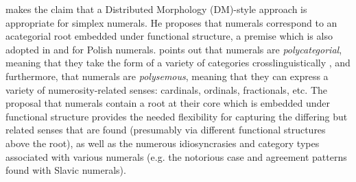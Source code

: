 \documentclass[output=paper]{langscibook}
\begin{document}
\cite[Ch. 3]{fehri2018numRoot} makes the claim that a Distributed Morphology (DM)-style approach is appropriate for simplex numerals. He proposes that numerals correspond to an acategorial root embedded under functional structure, a premise which is also adopted in \citet{klockmann2017semiLex} and \citet{wagiel2017several, wagiel2018fasl} for Polish numerals. \cite[61]{fehri2018numRoot} points out that numerals are \textit{polycategorial}, meaning that they  take the form of a variety of categories crosslinguistically \citep[see e.g.][section 3.4 for examples of nominal, adjectival, verbal, and mixed numerals]{i&m2018}%
, and furthermore, that numerals are \textit{polysemous}, meaning that they can express a variety of numerosity-related senses: cardinals, ordinals, fractionals, etc. The proposal that numerals contain a root at their core which is embedded under functional structure provides the needed flexibility for capturing the differing but related senses that are found (presumably via different functional structures above the root), as well as the numerous idiosyncrasies and category types associated with various numerals (e.g. the notorious case and agreement patterns found with Slavic numerals). 

\end{document}
